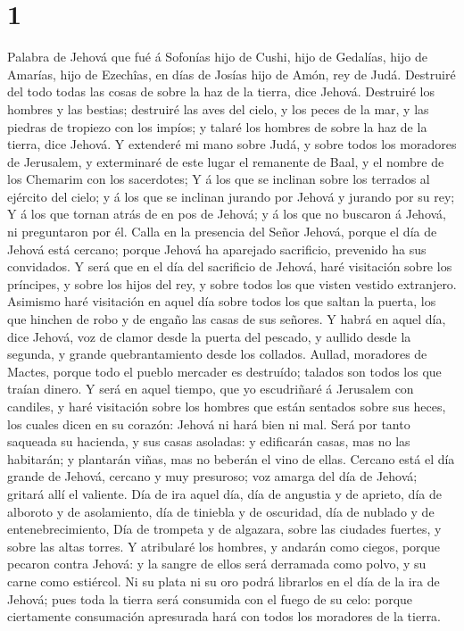 \hypertarget{section}{%
\section{1}\label{section}}

 Palabra de Jehová que fué á Sofonías hijo de Cushi, hijo de
Gedalías, hijo de Amarías, hijo de Ezechîas, en días de Josías hijo de
Amón, rey de Judá.  Destruiré del todo todas las cosas de
sobre la haz de la tierra, dice Jehová.  Destruiré los
hombres y las bestias; destruiré las aves del cielo, y los peces de la
mar, y las piedras de tropiezo con los impíos; y talaré los hombres de
sobre la haz de la tierra, dice Jehová.  Y extenderé mi mano
sobre Judá, y sobre todos los moradores de Jerusalem, y exterminaré de
este lugar el remanente de Baal, y el nombre de los Chemarim con los
sacerdotes;  Y á los que se inclinan sobre los terrados al
ejército del cielo; y á los que se inclinan jurando por Jehová y jurando
por su rey;  Y á los que tornan atrás de en pos de Jehová; y
á los que no buscaron á Jehová, ni preguntaron por él. 
Calla en la presencia del Señor Jehová, porque el día de Jehová está
cercano; porque Jehová ha aparejado sacrificio, prevenido ha sus
convidados.  Y será que en el día del sacrificio de Jehová,
haré visitación sobre los príncipes, y sobre los hijos del rey, y sobre
todos los que visten vestido extranjero.  Asimismo haré
visitación en aquel día sobre todos los que saltan la puerta, los que
hinchen de robo y de engaño las casas de sus señores.  Y
habrá en aquel día, dice Jehová, voz de clamor desde la puerta del
pescado, y aullido desde la segunda, y grande quebrantamiento desde los
collados.  Aullad, moradores de Mactes, porque todo el
pueblo mercader es destruído; talados son todos los que traían dinero.
 Y será en aquel tiempo, que yo escudriñaré á Jerusalem con
candiles, y haré visitación sobre los hombres que están sentados sobre
sus heces, los cuales dicen en su corazón: Jehová ni hará bien ni mal.
 Será por tanto saqueada su hacienda, y sus casas asoladas:
y edificarán casas, mas no las habitarán; y plantarán viñas, mas no
beberán el vino de ellas.  Cercano está el día grande de
Jehová, cercano y muy presuroso; voz amarga del día de Jehová; gritará
allí el valiente.  Día de ira aquel día, día de angustia y
de aprieto, día de alboroto y de asolamiento, día de tiniebla y de
oscuridad, día de nublado y de entenebrecimiento,  Día de
trompeta y de algazara, sobre las ciudades fuertes, y sobre las altas
torres.  Y atribularé los hombres, y andarán como ciegos,
porque pecaron contra Jehová: y la sangre de ellos será derramada como
polvo, y su carne como estiércol.  Ni su plata ni su oro
podrá librarlos en el día de la ira de Jehová; pues toda la tierra será
consumida con el fuego de su celo: porque ciertamente consumación
apresurada hará con todos los moradores de la tierra.

